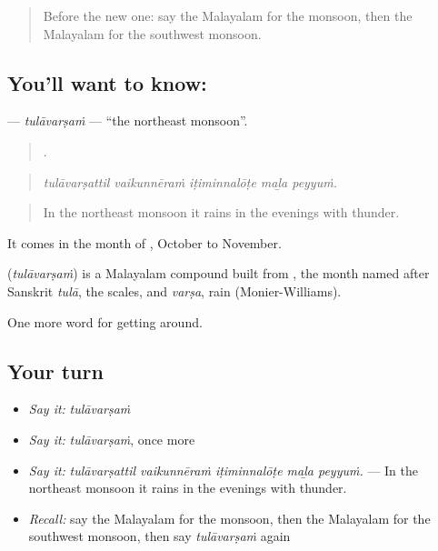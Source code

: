 \label{lesson:ML-C507-tulavarsam}



\begin{quote}
Before the new one: say the Malayalam for the monsoon, then the Malayalam for the southwest monsoon.
\end{quote}

\subsection*{You'll want to know: }
\textbf{} — \emph{tulāvarṣaṁ} — \textquotedblleft{}the northeast monsoon\textquotedblright{}.

\begin{quote}
    .
\end{quote}

\begin{quote}
\emph{tulāvarṣattil vaikunnēraṁ iṭiminnalōṭe maḻa peyyuṁ.}
\end{quote}

\begin{quote}
In the northeast monsoon it rains in the evenings with thunder.
\end{quote}

It comes in the month of , October to November.

\begin{cousinweb}
\textbf{} (\emph{tulāvarṣaṁ}) is a Malayalam compound built from , the month named after Sanskrit \emph{tulā}, the scales, and \emph{varṣa}, rain (Monier-Williams).
\end{cousinweb}

\begin{grammarlens}[title={What you've built}]
One more word for getting around.
\end{grammarlens}

\subsection*{Your turn}
\begin{itemize}
\raggedright
  \item \emph{Say it:} \emph{tulāvarṣaṁ}
  \item \emph{Say it:} \emph{tulāvarṣaṁ}, once more
  \item \emph{Say it:} \emph{tulāvarṣattil vaikunnēraṁ iṭiminnalōṭe maḻa peyyuṁ.} — In the northeast monsoon it rains in the evenings with thunder.
  \item \emph{Recall:} say the Malayalam for the monsoon, then the Malayalam for the southwest monsoon, then say \emph{tulāvarṣaṁ} again
\end{itemize}

